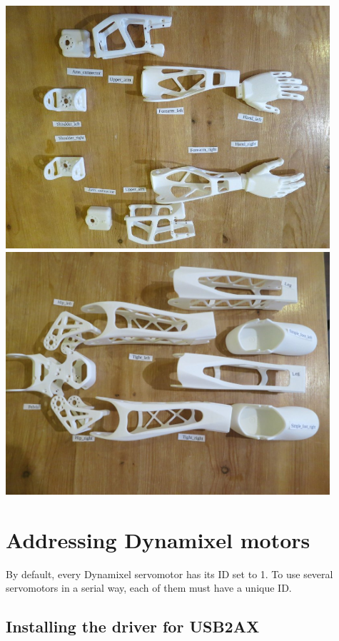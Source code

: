 \documentclass{article}
\begin{document}
\begin{center}
  \vspace{1mm}
  \includegraphics[width=0.9\textwidth]{img/parts_arms}\\
  \vspace{1mm}
  \includegraphics[width=0.9\textwidth]{img/parts_legs}
 \end{center}



\section{Addressing Dynamixel motors}
\label{addressing-poppys-motors}

By default, every Dynamixel servomotor has its ID set to 1. To use several servomotors in a serial way, each of them must have a unique ID.

\subsection{Installing the driver for USB2AX}
\end{document}
